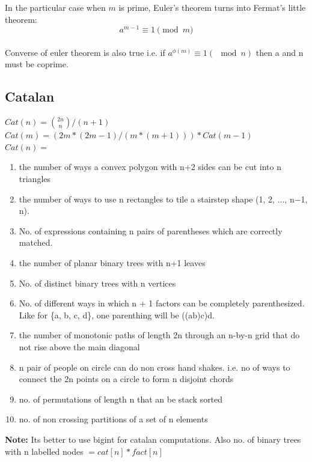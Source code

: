 \documentclass[8pt, a4paper, oneside, twocolumn]{extarticle}
\begin{document}
In the particular case when $m$ is prime, Euler's theorem turns into Fermat's little theorem: $$a^{m - 1} \equiv 1 \pmod m$$
\\Converse of euler theorem is also true i.e. if $a^{\phi(m)} \equiv 1 (\mod n)$ then a and n must be coprime.
\subsection{Catalan}
$Cat(n) = \binom{2n}{n} / (n + 1)$
\\$Cat(m) = (2m*(2m - 1)/(m*(m + 1))) * Cat(m - 1)$
\\$Cat(n) = $\begin{enumerate}
    \item the number of ways a convex polygon with n+2 sides can be cut into n triangles
    \item the number of ways to use n rectangles to tile a stairstep shape (1, 2, ..., n−1, n).
    \item No. of expressions containing n pairs of parentheses which are correctly matched.
    \item the number of planar binary trees with n+1 leaves
    \item No. of distinct binary trees with n vertices
    \item No. of different ways in which n + 1 factors can be completely parenthesized. Like for \{a, b, c, d\}, one parenthing will be ((ab)c)d.
    \item the number of monotonic paths of length 2n through an n-by-n grid that do not rise above the main diagonal
    \item n pair of people on circle can do non cross hand shakes. i.e. no of ways to connect the 2n points on a circle to form n disjoint chords
    \item no. of permutations of length n that an be stack sorted
    \item no. of non crossing partitions of a set of n elements
\end{enumerate}
\textbf{Note: }Its better to use bigint for catalan computations. Also no. of binary trees with n labelled nodes $= cat[n] * fact[n]$
\end{document}
